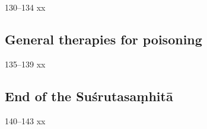 \begin{translation}
 \item [130--134] xx
 
\subsection{General therapies for poisoning}

\item [135--139] xx

\subsection{End of the Suśrutasaṃhitā}

\item[140--143] xx
 
\end{translation}